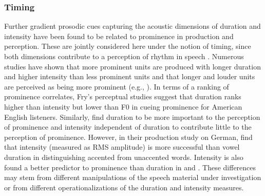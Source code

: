 \subsubsection{Timing} \label{section: timing}

Further gradient prosodic cues capturing the acoustic dimensions of duration and intensity have been found to be related to prominence in production and perception. These are jointly considered here under the notion of timing, since both dimensions contribute to a perception of rhythm in speech \citep[cf.][]{albertRhythmTimescale2024}. Numerous studies have shown that more prominent units are produced with longer duration and higher intensity than less prominent units and that longer and louder units are perceived as being more prominent (e.g., \citealt{fryDurationIntensityPhysical1955, beckmanStressNonStressAccent1986, aylettSmoothSignalRedundancy2004,  coleSoundStructureMeaning2019}). In terms of a ranking of prominence correlates, Fry's \citeyearpar{fryDurationIntensityPhysical1955, fryExperimentsPerceptionStress1958} perceptual studies suggest that duration ranks higher than intensity but lower than F0 in cueing prominence for American English listeners. Similarly, \citet{turkProcessingDurationIntensity1996} find duration to be more important to the perception of prominence and intensity independent of duration to contribute little to the perception of prominence. However, in their production study on German, \citet{roessigTracingPhoneticSpace2022} find that intensity (measured as RMS amplitude) is more successful than vowel duration in distinguishing accented from unaccented words. Intensity is also found a better predictor to prominence than duration in \citet{liebermanAcousticCorrelatesWord1960} and \citet{kochanskiLoudnessPredictsProminence2005}. These differences may stem from different manipulations of the speech material under investigation or from different operationalizations of the duration and intensity measures.

